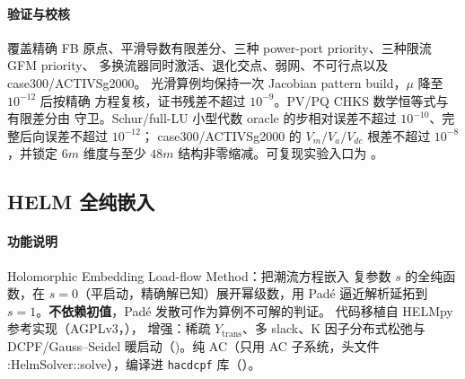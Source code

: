 \paragraph{验证与校核}  覆盖精确 FB
原点、平滑导数有限差分、三种 power-port priority、三种限流 GFM priority、
多换流器同时激活、退化交点、弱网、不可行点以及 case300/ACTIVSg2000。
光滑算例均保持一次 Jacobian pattern build，$\mu$ 降至 $10^{-12}$ 后按精确
方程复核，证书残差不超过 $10^{-9}$。PV/PQ CHKS 数学恒等式与有限差分由
 守卫。Schur/full-LU 小型代数
oracle 的步相对误差不超过 $10^{-10}$、完整后向误差不超过 $10^{-12}$；
case300/ACTIVSg2000 的 $V_m/V_a/V_{dc}$ 根差不超过 $10^{-8}$，并锁定
$6m$ 维度与至少 $48m$ 结构非零缩减。可复现实验入口为
。

\subsection{HELM 全纯嵌入}\label{sec:robust:helm}

\paragraph{功能说明} Holomorphic Embedding Load-flow Method：把潮流方程嵌入
复参数 $s$ 的全纯函数，在 $s=0$（平启动，精确解已知）展开幂级数，用 Padé
逼近解析延拓到 $s=1$。\textbf{不依赖初值}，Padé 发散可作为算例不可解的判证。
代码移植自 HELMpy 参考实现（AGPLv3，），
增强：稀疏 $Y_{\mathrm{trans}}$、多 slack、K 因子分布式松弛与
DCPF/Gauss--Seidel 暖启动（)。纯 AC（只用 AC 子系统，头文件
:HelmSolver::solve），编译进 \texttt{hacdcpf} 库（）。
